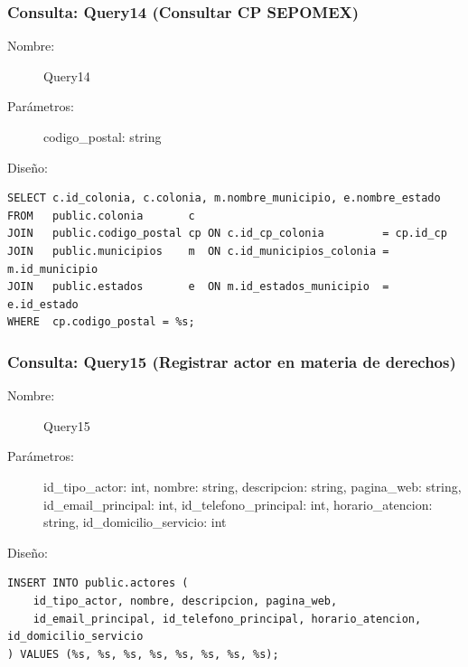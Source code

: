 \subsubsection{Consulta: Query14 (Consultar CP SEPOMEX)}
\begin{description}
    \item[Nombre:] Query14
    \item[Parámetros:] codigo\_postal: string
    \item[Diseño:] \cdtEmpty
\end{description}
\begin{verbatim}
SELECT c.id_colonia, c.colonia, m.nombre_municipio, e.nombre_estado
FROM   public.colonia       c
JOIN   public.codigo_postal cp ON c.id_cp_colonia         = cp.id_cp
JOIN   public.municipios    m  ON c.id_municipios_colonia = m.id_municipio
JOIN   public.estados       e  ON m.id_estados_municipio  = e.id_estado
WHERE  cp.codigo_postal = %s;
\end{verbatim}

\subsubsection{Consulta: Query15 (Registrar actor en materia de derechos)}
\begin{description}
    \item[Nombre:] Query15
    \item[Parámetros:] id\_tipo\_actor: int, nombre: string, descripcion: string, pagina\_web: string, id\_email\_principal: int, id\_telefono\_principal: int, horario\_atencion: string, id\_domicilio\_servicio: int
    \item[Diseño:] \cdtEmpty
\end{description}
\begin{verbatim}
INSERT INTO public.actores (
    id_tipo_actor, nombre, descripcion, pagina_web, 
    id_email_principal, id_telefono_principal, horario_atencion, id_domicilio_servicio
) VALUES (%s, %s, %s, %s, %s, %s, %s, %s);
\end{verbatim}

